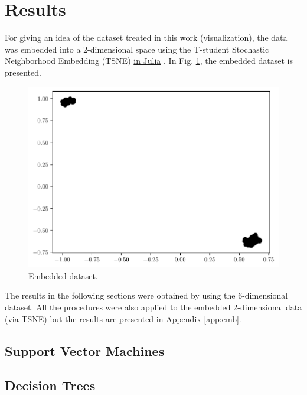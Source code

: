 \documentclass[conference]{IEEEtran}
\theoremstyle{definition}
\theoremstyle{remark}
\theoremstyle{remark}
\begin{document}
\section{Results}\label{sec:res}
For giving an idea of the dataset treated in this work (visualization), the data
was embedded into a 2-dimensional space using the T-student Stochastic
Neighborhood Embedding (TSNE) \href{https://github.com/lejon/TSne.jl}{in Julia}
\parencite{maaten2008}. In Fig. \ref{fig:emb_dat}, the embedded dataset is
presented.
\begin{figure}
  \includegraphics[width=\columnwidth]{figs/embedded-data.pdf}
  \caption{Embedded dataset.}
  \label{fig:emb_dat}
\end{figure}

The results in the following sections were obtained by using the 6-dimensional
dataset. All the procedures were also applied to the embedded 2-dimensional
data (via TSNE) but the results are presented in Appendix \ref{app:emb}.

\subsection{Support Vector Machines}


\subsection{Decision Trees}

\end{document}
